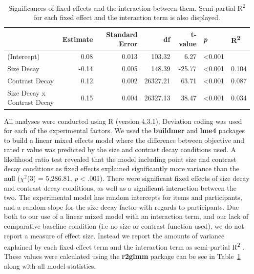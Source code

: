 \documentclass[manuscript, review, anonymous, screen]{acmart}
\begin{document}
\hypertarget{tbl-sig}{}
\begin{table}
\caption{\label{tbl-sig}Significances of fixed effects and the interaction between them.
Semi-partial R\textsuperscript{2} for each fixed effect and the
interaction term is also displayed. }\tabularnewline

\centering
\begin{tabular}{lrrrrll}
\toprule
  & Estimate & Standard Error & df & t-value & \textit{p} & R\textsuperscript{2}\\
\midrule
(Intercept) & 0.08 & 0.013 & 103.32 & 6.27 & <0.001 & \\
Size Decay & -0.14 & 0.005 & 148.39 & -25.77 & <0.001 & 0.104\\
Contrast Decay & 0.12 & 0.002 & 26327.21 & 63.71 & <0.001 & 0.087\\
Size Decay x Contrast Decay & 0.15 & 0.004 & 26327.13 & 38.47 & <0.001 & 0.034\\
\bottomrule
\end{tabular}
\end{table}

All analyses were conducted using R (version 4.3.1). Deviation coding
was used for each of the experimental factors. We used the
\textbf{buildmer} and \textbf{lme4} packages to build a linear mixed
effects model where the difference between objective and rated r value
was predicted by the size and contrast decay conditions used. A
likelihood ratio test revealed that the model including point size and
contrast decay conditions as fixed effects explained significantly more
variance than the null (\(\chi^2\)(3) = 5,286.81, \emph{p} \textless{}
.001). There were significant fixed effects of size decay and contrast
decay conditions, as well as a significant interaction between the two.
The experimental model has random intercepts for items and participants,
and a random slope for the size decay factor with regards to
participants. Due both to our use of a linear mixed model with an
interaction term, and our lack of comparative baseline condition (i.e no
size or contrast function used), we do not report a measure of effect
size. Instead we report the amounts of variance explained by each fixed
effect term and the interaction term as semi-partial
R\textsuperscript{2} \citep{nakagawa_2013}. These values were calculated
using the \textbf{r2glmm} package \citep{r2glmm} can be see in
Table~\ref{tbl-sig} along with all model statistics.
\end{document}
